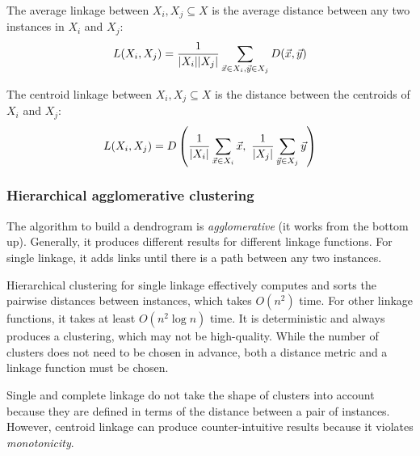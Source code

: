 \begin{dfn}
  The average linkage between $X_i, X_j \subseteq X$ is the average distance
  between any two instances in $X_i$ and $X_j$:
  \begin{equation}
    L(X_i, X_j) =
    \frac{1}{|X_i| |X_j|}
    \sum_{\vec{x} \in X_i, \vec{y} \in X_j} D(\vec{x}, \vec{y})
  \end{equation}
\end{dfn}

\begin{dfn}
  The centroid linkage between $X_i, X_j \subseteq X$ is the distance between
  the centroids of $X_i$ and $X_j$:
  \begin{equation}
    L(X_i, X_j) = D\left(
    \frac{1}{|X_i|} \sum_{\vec{x} \in X_i} \vec{x},\
    \frac{1}{|X_j|} \sum_{\vec{y} \in X_j} \vec{y}
    \right)
  \end{equation}
\end{dfn}

\subsubsection{Hierarchical agglomerative clustering}

The algorithm to build a dendrogram is \textit{agglomerative} (it works from the
bottom up).
Generally, it produces different results for different linkage functions.
For single linkage, it adds links until there is a path between any two
instances.

Hierarchical clustering for single linkage effectively computes and sorts the
pairwise distances between instances, which takes $O(n^2)$ time.
For other linkage functions, it takes at least $O(n^2 \log n)$ time.
It is deterministic and always produces a clustering, which may not be
high-quality.
While the number of clusters does not need to be chosen in advance, both a
distance metric and a linkage function must be chosen.

Single and complete linkage do not take the shape of clusters into account
because they are defined in terms of the distance between a pair of instances.
However, centroid linkage can produce counter-intuitive results because it
violates \textit{monotonicity}.
